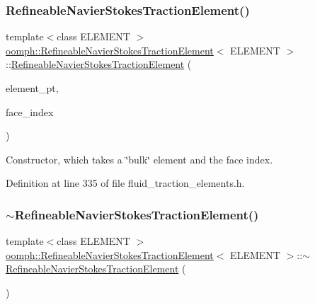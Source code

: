 \subsubsection{\texorpdfstring{Refineable\+Navier\+Stokes\+Traction\+Element()}{RefineableNavierStokesTractionElement()}}
{\footnotesize\ttfamily template$<$class E\+L\+E\+M\+E\+NT $>$ \\
\hyperlink{classoomph_1_1RefineableNavierStokesTractionElement}{oomph\+::\+Refineable\+Navier\+Stokes\+Traction\+Element}$<$ E\+L\+E\+M\+E\+NT $>$\+::\hyperlink{classoomph_1_1RefineableNavierStokesTractionElement}{Refineable\+Navier\+Stokes\+Traction\+Element} (\begin{DoxyParamCaption}\item[{\hyperlink{classoomph_1_1FiniteElement}{Finite\+Element} $\ast$const \&}]{element\+\_\+pt,  }\item[{const int \&}]{face\+\_\+index }\end{DoxyParamCaption})\hspace{0.3cm}{\ttfamily [inline]}}



Constructor, which takes a \char`\"{}bulk\char`\"{} element and the face index. 



Definition at line 335 of file fluid\+\_\+traction\+\_\+elements.\+h.

\mbox{\label{classoomph_1_1RefineableNavierStokesTractionElement_ae99e7e53ea523fc1876c62f0e6598245}} 
\subsubsection{\texorpdfstring{$\sim$\+Refineable\+Navier\+Stokes\+Traction\+Element()}{~RefineableNavierStokesTractionElement()}}
{\footnotesize\ttfamily template$<$class E\+L\+E\+M\+E\+NT $>$ \\
\hyperlink{classoomph_1_1RefineableNavierStokesTractionElement}{oomph\+::\+Refineable\+Navier\+Stokes\+Traction\+Element}$<$ E\+L\+E\+M\+E\+NT $>$\+::$\sim$\hyperlink{classoomph_1_1RefineableNavierStokesTractionElement}{Refineable\+Navier\+Stokes\+Traction\+Element} (\begin{DoxyParamCaption}{ }\end{DoxyParamCaption})\hspace{0.3cm}{\ttfamily [inline]}}



